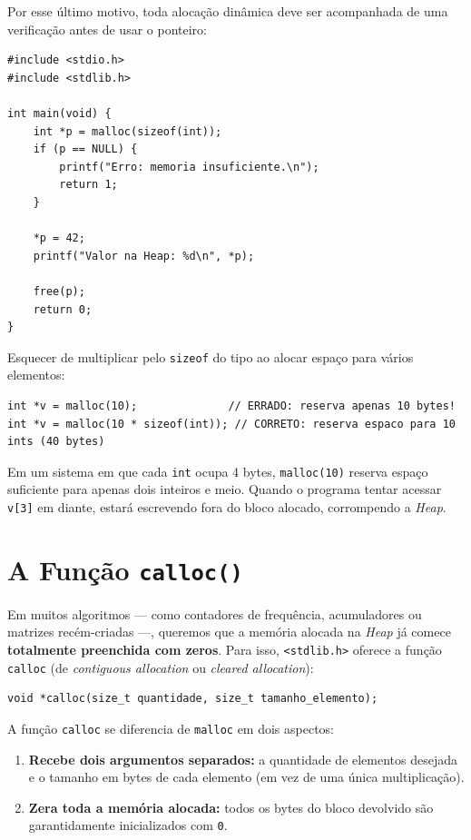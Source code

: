 Por esse último motivo, toda alocação dinâmica deve ser acompanhada de uma verificação antes de usar o ponteiro:

\begin{lstlisting}
#include <stdio.h>
#include <stdlib.h>

int main(void) {
    int *p = malloc(sizeof(int));
    if (p == NULL) {
        printf("Erro: memoria insuficiente.\n");
        return 1;
    }

    *p = 42;
    printf("Valor na Heap: %d\n", *p);

    free(p);
    return 0;
}
\end{lstlisting}

\begin{errocomum}
Esquecer de multiplicar pelo \texttt{sizeof} do tipo ao alocar espaço para vários elementos:
\begin{lstlisting}
int *v = malloc(10);              // ERRADO: reserva apenas 10 bytes!
int *v = malloc(10 * sizeof(int)); // CORRETO: reserva espaco para 10 ints (40 bytes)
\end{lstlisting}
Em um sistema em que cada \texttt{int} ocupa 4 bytes, \texttt{malloc(10)} reserva espaço suficiente para apenas dois inteiros e meio. Quando o programa tentar acessar \texttt{v[3]} em diante, estará escrevendo fora do bloco alocado, corrompendo a \textit{Heap}.
\end{errocomum}

\section{A Função \texttt{calloc()}}
\label{sec:funcao-calloc}

Em muitos algoritmos — como contadores de frequência, acumuladores ou matrizes recém-criadas —, queremos que a memória alocada na \textit{Heap} já comece \textbf{totalmente preenchida com zeros}. Para isso, \texttt{<stdlib.h>} oferece a função \texttt{calloc} (de \textit{contiguous allocation} ou \textit{cleared allocation}):

\begin{lstlisting}
void *calloc(size_t quantidade, size_t tamanho_elemento);
\end{lstlisting}

A função \texttt{calloc} se diferencia de \texttt{malloc} em dois aspectos:

\begin{enumerate}
    \item \textbf{Recebe dois argumentos separados:} a quantidade de elementos desejada e o tamanho em bytes de cada elemento (em vez de uma única multiplicação).
    \item \textbf{Zera toda a memória alocada:} todos os bytes do bloco devolvido são garantidamente inicializados com \texttt{0}.
\end{enumerate}

